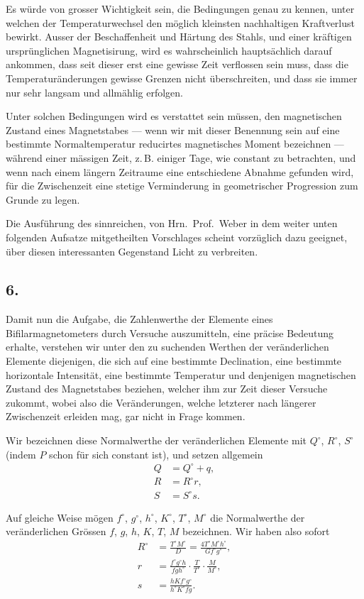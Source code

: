 \documentclass[12pt,a4paper]{article}
\begin{document}
Es würde von grosser Wichtigkeit sein, die Bedingungen genau zu kennen, unter welchen der Temperaturwechsel den möglich kleinsten nachhaltigen Kraftverlust bewirkt. Ausser der Beschaffenheit und Härtung des Stahls, und einer kräftigen ursprünglichen Magnetisirung, wird es wahrscheinlich hauptsächlich darauf ankommen, dass seit dieser erst eine gewisse Zeit verflossen sein muss, dass die Temperaturänderungen gewisse Grenzen nicht überschreiten, und dass sie immer nur sehr langsam und allmählig erfolgen.

Unter solchen Bedingungen wird es verstattet sein müssen, den magnetischen Zustand eines Magnetstabes --- wenn wir mit dieser Benennung sein auf eine bestimmte Normaltemperatur reducirtes magnetisches Moment bezeichnen --- während einer mässigen Zeit, z.\,B. einiger Tage, wie constant zu betrachten, und wenn nach einem längern Zeitraume eine entschiedene Abnahme gefunden wird, für die Zwischenzeit eine stetige Verminderung in geometrischer Progression zum Grunde zu legen.

Die Ausführung des sinnreichen, von Hrn.~Prof.~Weber in dem weiter unten folgenden Aufsatze mitgetheilten Vorschlages scheint vorzüglich dazu geeignet, über diesen interessanten Gegenstand Licht zu verbreiten.

\subsection*{6.}

Damit nun die Aufgabe, die Zahlenwerthe der Elemente eines Bifilarmagnetometers durch Versuche auszumitteln, eine präcise Bedeutung erhalte, verstehen wir unter den zu suchenden Werthen der veränderlichen Elemente diejenigen, die sich auf eine bestimmte Declination, eine bestimmte horizontale Intensität, eine bestimmte Temperatur und denjenigen magnetischen Zustand des Magnetstabes beziehen, welcher ihm zur Zeit dieser Versuche zukommt, wobei also die Veränderungen, welche letzterer nach längerer Zwischenzeit erleiden mag, gar nicht in Frage kommen.

Wir bezeichnen diese Normalwerthe der veränderlichen Elemente mit $Q^{\circ}$, $R^{\circ}$, $S^{\circ}$ (indem $P$ schon für sich constant ist), und setzen allgemein
\begin{align}
Q &= Q^{\circ} + q,\\
R &= R^{\circ}r,\\
S &= S^{\circ}s.
\end{align}

Auf gleiche Weise mögen $f^{\circ}$, $g^{\circ}$, $h^{\circ}$, $K^{\circ}$, $T^{\circ}$, $M^{\circ}$ die Normalwerthe der veränderlichen Grössen $f$, $g$, $h$, $K$, $T$, $M$ bezeichnen. Wir haben also sofort
\begin{align}
R^{\circ} &= \frac{T^{\circ}M^{\circ}}{D} = \frac{4T^{\circ}M^{\circ}h^{\circ}}{Gf^{\circ}g^{\circ}},\\
r &= \frac{f^{\circ}g^{\circ}h}{fgh^{\circ}} \cdot \frac{T}{T^{\circ}} \cdot \frac{M}{M^{\circ}},\\
s &= \frac{hKf^{\circ}g^{\circ}}{h^{\circ}K^{\circ}fg}.
\end{align}
\end{document}
